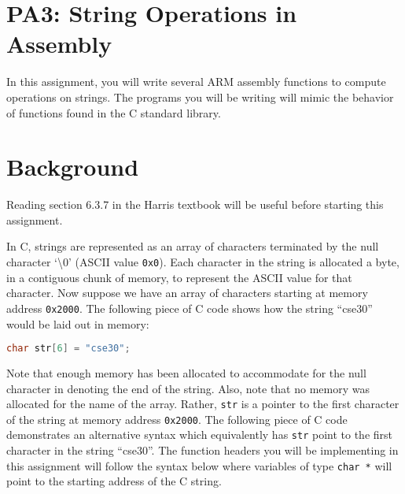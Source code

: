 \documentclass{article}
\begin{document}
\section{PA3: String Operations in Assembly}

In this assignment, you will write several ARM assembly functions to compute operations on strings. The programs you will be writing will mimic the behavior of functions found in the C standard library.

\section{Background}

Reading section 6.3.7 in the Harris textbook will be useful before starting this assignment. \newline

In C, strings are represented as an array of characters terminated by the null character `\textbackslash 0' (ASCII value {\tt 0x0}). Each character in the string is allocated a byte, in a contiguous chunk of memory, to represent the ASCII value for that character. Now suppose we have an array of characters starting at memory address {\tt0x2000}. The following piece of C code shows how the string ``cse30'' would be laid out in memory: \newline

\begin{lstlisting}[language = C]
char str[6] = "cse30";
\end{lstlisting}

\renewcommand{\arraystretch}{2}
\begin{table}[h]
\centering
{}
\end{table}

Note that enough memory has been allocated to accommodate for the null character in denoting the end of the string. 
Also, note that no memory was allocated for the name of the array. Rather, {\tt str} is a pointer to the first character of the string at memory address {\tt0x2000}. The following piece of C code demonstrates an alternative syntax which  equivalently has {\tt str} point to the first character in the string ``cse30''. The function headers you will be implementing in this assignment will follow the syntax below where variables of type {\tt char *} will point to the starting address of the C string. \newline
\end{document}
